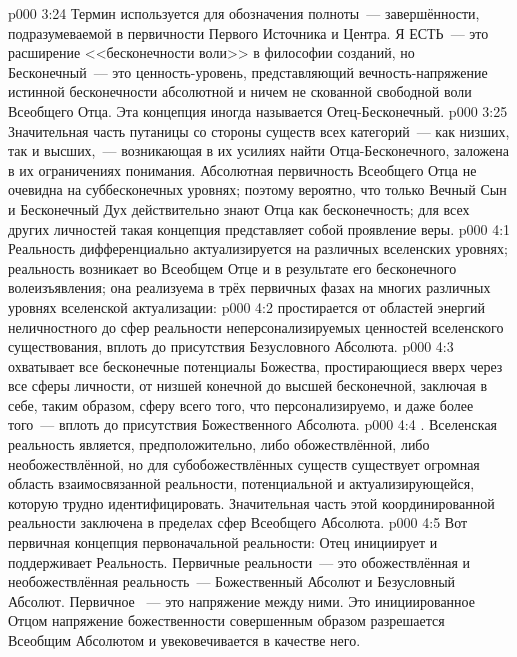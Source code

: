 \vs p000 3:24 \pc Термин  используется для обозначения полноты~--- завершённости, подразумеваемой в первичности Первого Источника и Центра.  Я ЕСТЬ~--- это расширение <<бесконечности воли>> в философии созданий, но Бесконечный~--- это  ценность\hyp{}уровень, представляющий вечность\hyp{}напряжение истинной бесконечности абсолютной и ничем не скованной свободной воли Всеобщего Отца. Эта концепция иногда называется Отец\hyp{}Бесконечный.
\vs p000 3:25 Значительная часть путаницы со стороны существ всех категорий~--- как низших, так и высших,~--- возникающая в их усилиях найти Отца\hyp{}Бесконечного, заложена в их ограничениях понимания. Абсолютная первичность Всеобщего Отца не очевидна на суббесконечных уровнях; поэтому вероятно, что только Вечный Сын и Бесконечный Дух действительно знают Отца как бесконечность; для всех других личностей такая концепция представляет собой проявление веры.
\vs p000 4:1 Реальность дифференциально актуализируется на различных вселенских уровнях; реальность возникает во Всеобщем Отце и в результате его бесконечного волеизъявления; она реализуема в трёх первичных фазах на многих различных уровнях вселенской актуализации:
\vs p000 4:2  простирается от областей энергий неличностного до сфер реальности неперсонализируемых ценностей вселенского существования, вплоть до присутствия Безусловного Абсолюта.
\vs p000 4:3  охватывает все бесконечные потенциалы Божества, простирающиеся вверх через все сферы личности, от низшей конечной до высшей бесконечной, заключая в себе, таким образом, сферу всего того, что персонализируемо, и даже более того~--- вплоть до присутствия Божественного Абсолюта.
\vs p000 4:4 . Вселенская реальность является, предположительно, либо обожествлённой, либо необожествлённой, но для субобожествлённых существ существует огромная область взаимосвязанной реальности, потенциальной и актуализирующейся, которую трудно идентифицировать. Значительная часть этой координированной реальности заключена в пределах сфер Всеобщего Абсолюта.
\vs p000 4:5 Вот первичная концепция первоначальной реальности: Отец инициирует и поддерживает Реальность. Первичные  реальности~--- это обожествлённая и необожествлённая реальность~--- Божественный Абсолют и Безусловный Абсолют. Первичное ~--- это напряжение между ними. Это инициированное Отцом напряжение божественности совершенным образом разрешается Всеобщим Абсолютом и увековечивается в качестве него.
